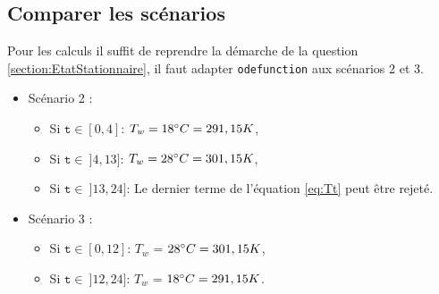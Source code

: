 \documentclass[12pt]{article}
\begin{document}
    \subsection{Comparer les scénarios}
        Pour les calculs il suffit de reprendre la démarche de la question \ref{section:EtatStationnaire}, il faut adapter \texttt{odefunction} aux scénarios 2 et 3. \begin{itemize}
            \item Scénario 2 : 
                    \begin{itemize}
                        \item Si $\texttt{t} \in [0,4]$: $T_w = 18\degree C = 291,15 K$,
                        \item Si $\texttt{t} \in \: ]4,13]$: $T_w = 28\degree C = 301,15 K$,
                        \item Si $\texttt{t} \in \: ]13, 24]$: Le dernier terme de l'équation \ref{eq:Tt} peut être rejeté.

                    \end{itemize}
            \item Scénario 3 : 
                    \begin{itemize}
                        \item Si $\texttt{t} \in [0,12]$: $T_w$ = $28\degree C = 301,15 K$,
                        \item Si $\texttt{t} \in \: ]12,24]$: $T_w$ = $18\degree C = 291,15 K$.

                    \end{itemize}
        \end{itemize}
\end{document}
